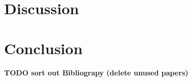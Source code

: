 \documentclass[a4paper,hidelinks,11pt,twoside,table,xcdraw]{memoir}
\begin{document}
\chapter{Discussion}
\label{ch:discussion}


\chapter{Conclusion}
\label{ch:conclusion}


\textcolor[rgb]{1,0,0}{\textbf{TODO sort out Bibliograpy (delete unused papers)}}



%



\appendix



\end{document}
